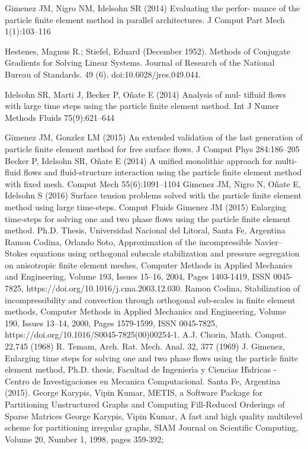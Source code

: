  Gimenez JM, Nigro NM, Idelsohn SR (2014) Evaluating the perfor-
mance of the particle finite element method in parallel architectures.
J Comput Part Mech 1(1):103–116

 Hestenes, Magnus R.; Stiefel, Eduard (December 1952). Methods of Conjugate Gradients for Solving Linear Systems. Journal of Research of the National Bureau of Standards. 49 (6). doi:10.6028/jres.049.044.

 Idelsohn SR, Marti J, Becker P, Oñate E (2014) Analysis of mul-
tifluid flows with large time steps using the particle finite element
method. Int J Numer Methods Fluids 75(9):621–644

 Gimenez JM, Gonzlez LM (2015) An extended validation of the
last generation of particle finite element method for free surface
flows. J Comput Phys 284:186–205
 Becker P, Idelsohn SR, Oñate E (2014) A unified monolithic
approach for multi-fluid flows and fluid-structure interaction using
the particle finite element method with fixed mesh. Comput Mech
55(6):1091–1104
 Gimenez JM, Nigro N, Oñate E, Idelsohn S (2016) Surface tension
problems solved with the particle finite element method using large
time-steps. Comput Fluids
 Gimenez JM (2015) Enlarging time-steps for solving one and two
phase flows using the particle finite element method. Ph.D. Thesis,
Universidad Nacional del Litoral, Santa Fe, Argentina
 Ramon Codina, Orlando Soto,
Approximation of the incompressible Navier–Stokes equations using orthogonal subscale stabilization and pressure segregation on anisotropic finite element meshes,
Computer Methods in Applied Mechanics and Engineering,
Volume 193, Issues 15–16,
2004,
Pages 1403-1419,
ISSN 0045-7825,
https://doi.org/10.1016/j.cma.2003.12.030.
 Ramon Codina,
Stabilization of incompressibility and convection through orthogonal sub-scales in finite element methods,
Computer Methods in Applied Mechanics and Engineering,
Volume 190, Issues 13–14,
2000,
Pages 1579-1599,
ISSN 0045-7825,
https://doi.org/10.1016/S0045-7825(00)00254-1.
A.J. Chorin, Math. Comput. 22,745 (1968)
R. Temam, Arch. Rat. Mech. Anal. 32, 377 (1969)
  J. Gimenez, Enlarging time steps for solving one and two phase flows using the particle finite element
 method, Ph.D. thesis, Facultad de Ingenier\'{\i}a y Ciencias H\'{\i}dricas - Centro de Investigaciones en Mecanica
 Computacional. Santa Fe, Argentina (2015).
George Karypis, Vipin Kumar, METIS, a Software Package for Partitioning Unstructured Graphs and Computing Fill-Reduced Orderings of Sparse Matrices
George Karypis, Vipin Kumar, A fast and high quality multilevel scheme for partitioning irregular graphs, SIAM Journal on Scientific Computing, Volume 20, Number 1, 1998, pages 359-392; 

